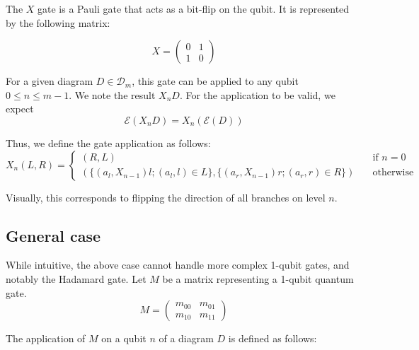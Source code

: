 The $X$ gate is a Pauli gate that acts as a bit-flip on the qubit. It is represented by the following matrix:

\[
X = \begin{pmatrix}
0 & 1 \\
1 & 0
\end{pmatrix}
\]

For a given diagram $D \in \mathcal{D}_m$, this gate can be applied to any qubit $0 \le n \le m-1$. We note the result $X_n D$. For the application to be valid, we expect
$$\mathcal E (X_n D) = X_n (\mathcal E (D))$$

Thus, we define the gate application as follows:
$$X_n(L, R) = \begin{cases}
    (R, L) \quad &\text{if } n = 0 \\
    (\{(a_l, X_{n-1}) l ; (a_l, l) \in L\}, \{(a_r, X_{n-1}) r ; (a_r, r) \in R\}) \quad &\text{otherwise}
\end{cases}$$

Visually, this corresponds to flipping the direction of all branches on level $n$.

\subsection{General case}

While intuitive, the above case cannot handle more complex 1-qubit gates, and notably the Hadamard gate. Let $M$ be a matrix representing a 1-qubit quantum gate.
$$M = \begin{pmatrix}
    m_{00} & m_{01} \\
    m_{10} & m_{11}
\end{pmatrix}$$

The application of $M$ on a qubit $n$ of a diagram $D$ is defined as follows:

